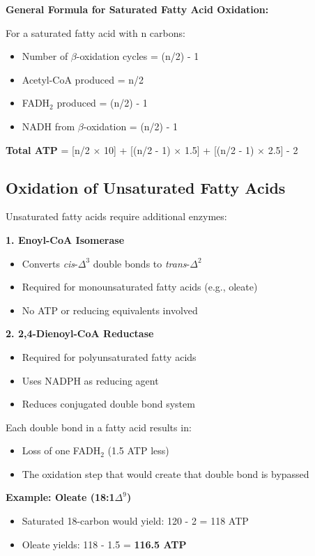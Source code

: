 \begin{theorem}
\textbf{General Formula for Saturated Fatty Acid Oxidation:}

For a saturated fatty acid with n carbons:
\begin{itemize}
    \item Number of $\beta$-oxidation cycles = (n/2) - 1
    \item Acetyl-CoA produced = n/2
    \item FADH$_2$ produced = (n/2) - 1
    \item NADH from $\beta$-oxidation = (n/2) - 1
\end{itemize}

\textbf{Total ATP} = [n/2 $\times$ 10] + [(n/2 - 1) $\times$ 1.5] + [(n/2 - 1) $\times$ 2.5] - 2
\end{theorem}

\subsection{Oxidation of Unsaturated Fatty Acids}

Unsaturated fatty acids require additional enzymes:

\textbf{1. Enoyl-CoA Isomerase}
\begin{itemize}
    \item Converts \textit{cis}-$\Delta^3$ double bonds to \textit{trans}-$\Delta^2$
    \item Required for monounsaturated fatty acids (e.g., oleate)
    \item No ATP or reducing equivalents involved
\end{itemize}

\textbf{2. 2,4-Dienoyl-CoA Reductase}
\begin{itemize}
    \item Required for polyunsaturated fatty acids
    \item Uses NADPH as reducing agent
    \item Reduces conjugated double bond system
\end{itemize}

\begin{tcolorbox}[colback=yellow!10, colframe=yellow!70!black, title=\textbf{ATP Yield from Unsaturated Fatty Acids}]
Each double bond in a fatty acid results in:
\begin{itemize}
    \item Loss of one FADH$_2$ (1.5 ATP less)
    \item The oxidation step that would create that double bond is bypassed
\end{itemize}

\textbf{Example: Oleate (18:1$\Delta^9$)}
\begin{itemize}
    \item Saturated 18-carbon would yield: 120 - 2 = 118 ATP
    \item Oleate yields: 118 - 1.5 = \textbf{116.5 ATP}
\end{itemize}
\end{tcolorbox}

